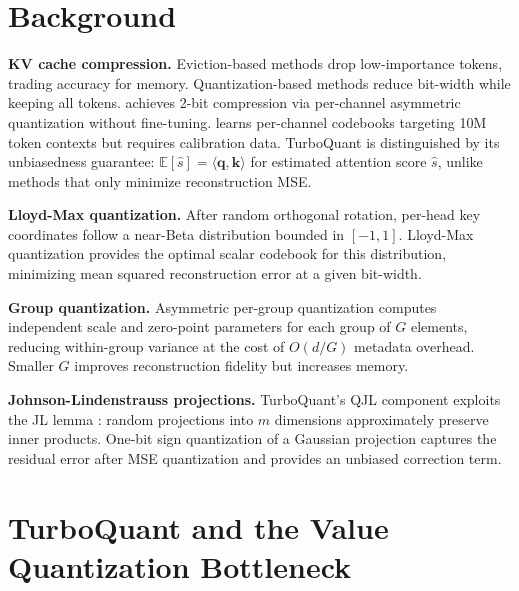 \documentclass{article}
\newcommand{\bm}[1]{\boldsymbol{#1}}
\newcommand{\Eop}{\mathbb{E}}
\begin{document}

\section{Background}
\label{sec:background}

\textbf{KV cache compression.}
Eviction-based methods \citep{zhang2023h2o} drop low-importance tokens, trading accuracy for memory. Quantization-based methods \citep{liu2024kivi,hooper2024kvquant} reduce bit-width while keeping all tokens. \citet{liu2024kivi} achieves 2-bit compression via per-channel asymmetric quantization without fine-tuning. \citet{hooper2024kvquant} learns per-channel codebooks targeting 10M token contexts but requires calibration data.
TurboQuant \citep{turboquant2025} is distinguished by its unbiasedness guarantee: $\Eop[\hat{s}] = \langle \bm{q}, \bm{k} \rangle$ for estimated attention score $\hat{s}$, unlike methods that only minimize reconstruction MSE.

\textbf{Lloyd-Max quantization.}
After random orthogonal rotation, per-head key coordinates follow a near-Beta distribution bounded in $[-1, 1]$. Lloyd-Max quantization \citep{lloyd1982least,max1960quantizing} provides the optimal scalar codebook for this distribution, minimizing mean squared reconstruction error at a given bit-width.

\textbf{Group quantization.}
Asymmetric per-group quantization \citep{frantar2023gptq} computes independent scale and zero-point parameters for each group of $G$ elements, reducing within-group variance at the cost of $O(d/G)$ metadata overhead. Smaller $G$ improves reconstruction fidelity but increases memory.

\textbf{Johnson-Lindenstrauss projections.}
TurboQuant's QJL component exploits the JL lemma \citep{johnson1984extensions}: random projections into $m$ dimensions approximately preserve inner products. One-bit sign quantization of a Gaussian projection captures the residual error after MSE quantization and provides an unbiased correction term.


\section{TurboQuant and the Value Quantization Bottleneck}
\label{sec:turboquant}
\end{document}
